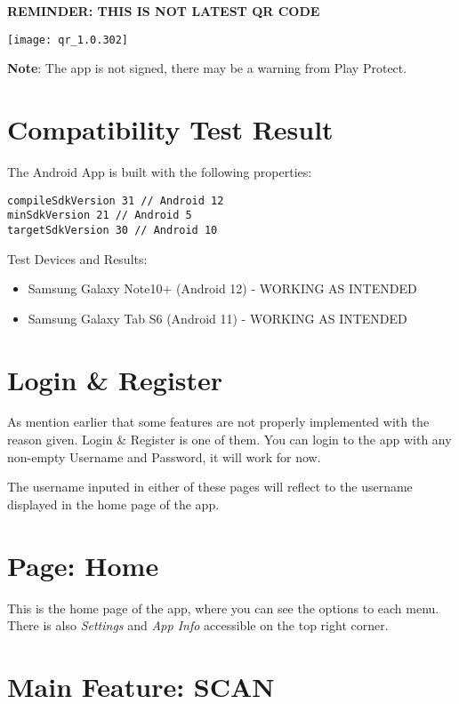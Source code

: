 \documentclass[a4paper,12pt]{article}
\begin{document}
\noindent\textbf{REMINDER: THIS IS NOT LATEST QR CODE}

\centerline{\texttt{[image: qr\_1.0.302]}}

\noindent
\textbf{Note}: The app is not signed, there may be a warning from Play Protect.

\section*{Compatibility Test Result}

\noindent
The Android App is built with the following properties:
\begin{lstlisting}
compileSdkVersion 31 // Android 12
minSdkVersion 21 // Android 5
targetSdkVersion 30 // Android 10
\end{lstlisting}

\noindent
Test Devices and Results:
\begin{itemize}
    \item Samsung Galaxy Note10+ (Android 12) - WORKING AS INTENDED
    \item Samsung Galaxy Tab S6 (Android 11) - WORKING AS INTENDED
\end{itemize}

\section{Login \& Register}


As mention earlier that some features are not properly implemented with the reason given.
Login \& Register is one of them.
You can login to the app with any non-empty Username and Password, it will work for now.

The username inputed in either of these pages will reflect to the username
displayed in the home page of the app.

\pagebreak
\section{Page: Home}


This is the home page of the app, where you can see the options to each menu.
There is also \textit{Settings} and \textit{App Info} accessible on the top
right corner.

\pagebreak
\section{Main Feature: SCAN}
\end{document}
